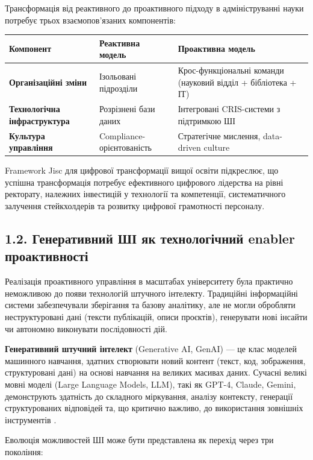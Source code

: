 Трансформація від реактивного до проактивного підходу в адмініструванні науки потребує трьох взаємопов'язаних компонентів:

\begin{longtable}{@{}p{}p{}p{}@{}}
\toprule
\textbf{Компонент} & \textbf{Реактивна модель} & \textbf{Проактивна модель} \\
\midrule
\textbf{Організаційні зміни} & Ізольовані підрозділи & Крос-функціональні команди (науковий відділ + бібліотека + ІТ) \\
\textbf{Технологічна інфраструктура} & Розрізнені бази даних & Інтегровані CRIS-системи з підтримкою ШІ \\
\textbf{Культура управління} & Compliance-орієнтованість & Стратегічне мислення, data-driven culture \\
\bottomrule
\end{longtable}

Framework Jisc для цифрової трансформації вищої освіти \cite{Jisc2023DigitalTransformationFramework} підкреслює, що успішна трансформація потребує ефективного цифрового лідерства на рівні ректорату, належних інвестицій у технології та компетенції, систематичного залучення стейкхолдерів та розвитку цифрової грамотності персоналу.

\subsection*{1.2. Генеративний ШІ як технологічний enabler проактивності}

Реалізація проактивного управління в масштабах університету була практично неможливою до появи технологій штучного інтелекту. Традиційні інформаційні системи забезпечували зберігання та базову аналітику, але не могли обробляти неструктуровані дані (тексти публікацій, описи проєктів), генерувати нові інсайти чи автономно виконувати послідовності дій.

\textbf{Генеративний штучний інтелект} (Generative AI, GenAI) --- це клас моделей машинного навчання, здатних створювати новий контент (текст, код, зображення, структуровані дані) на основі навчання на великих масивах даних. Сучасні великі мовні моделі (Large Language Models, LLM), такі як GPT-4, Claude, Gemini, демонструють здатність до складного міркування, аналізу контексту, генерації структурованих відповідей та, що критично важливо, до використання зовнішніх інструментів \cite{Wang2024SurveyLLMAgents}.

Еволюція можливостей ШІ може бути представлена як перехід через три покоління:

